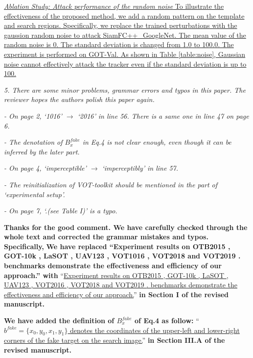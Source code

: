 \documentclass[12pt]{article}
\begin{document}
\uline{\textit{Ablation Study: Attack performance of the random noise} To illustrate the effectiveness of the proposed method, we add a random pattern on the template and search regions. 
Specifically, we replace the trained perturbations with the gaussion random noise to attack SiamFC++\_GoogleNet. The mean value of the random noise is 0. The standard deviation is changed from 1.0 to 100.0. The experiment is performed on GOT-Val.
As shown in Table \ref{table:noise}, Gaussian noise cannot effectively attack the tracker even if the standard deviation is up to 100.
}

\textit{
5. There are some minor problems, grammar errors and typos in this paper. The reviewer hopes the authors polish this paper again.}

\textit{- On page 2, ‘1016’ $\rightarrow$ ‘2016’ in line 56. There is a same one in line 47 on page 6.}

\textit{- The denotation of $B_x^{fake}$ in Eq.4 is not clear enough, even though it can be inferred by the later part.}

\textit{- On page 4, ‘imperceptible’ $\rightarrow$ ‘imperceptibly’ in line 57.}

\textit{- The reinitialization of VOT-toolkit should be mentioned in the part of ‘experimental setup’.}

\textit{- On page 7, ‘.(see Table I)’ is a typo.}

\textbf{Thanks for the good comment. We have carefully checked through the whole text and corrected the grammar mistakes and typos. Specifically,}
\textbf{We have replaced ``Experiment results on OTB2015 \cite{OTB}, GOT-10k \cite{GOT-10k}, LaSOT \cite{GOT-10k}, UAV123 \cite{UAV123}, VOT1016 \cite{VOT2016}, VOT2018 \cite{VOT2018} and VOT2019 \cite{VOT2019}. benchmarks demonstrate the effectiveness and efficiency of our approach.'' with}
``\uline{Experiment results on OTB2015 \cite{OTB}, GOT-10k \cite{GOT-10k}, LaSOT \cite{LaSOT}, UAV123 \cite{UAV123}, VOT2016 \cite{VOT2016}, VOT2018 \cite{VOT2018} and VOT2019 \cite{VOT2019}. benchmarks demonstrate the effectiveness and efficiency of our approach.}''
\textbf{in Section I of the revised manuscript.}

\textbf{We have added the definition of $B_x^{fake}$ of Eq.4 as follow:}
``\uline{$b^{fake} = \{x_0, y_0, x_1, y_1\}$ denotes the coordinates of the upper-left and lower-right corners of the fake target on the search image.}''
\textbf{in Section III.A of the revised manuscript.}
\end{document}
